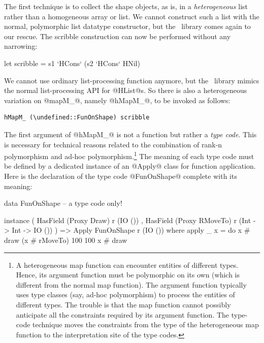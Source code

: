 The first technique is to collect the shape objects, as is, in a
\emph{heterogeneous} list rather than a homogeneous array or list. We
cannot construct such a list with the normal, polymorphic list datatype
constructor, but the \HList\ library comes again to our rescue. 
The scribble construction can now be performed without any
narrowing:

\begin{code}
       let scribble = s1 `HCons` (s2 `HCons` HNil)
\end{code}

\noindent
We cannot use ordinary list-processing function anymore, but the
\HList\ library mimics the normal list-processing API for @HList@s. So
there is also a heterogeneous variation on @mapM_@, namely @hMapM_@,
to be invoked as follows:

\begin{Verbatim}[fontsize=\small,commandchars=\\\{\}]
       hMapM_ (\undefined::FunOnShape) scribble
\end{Verbatim}

\noindent
The first argument of @hMapM_@ is not a function but rather a
\emph{type code}. This is necessary for technical reasons related to
the combination of rank-n polymorphism and ad-hoc
polymorphism.\footnote{A heterogeneous map function can encounter
entities of different types. Hence, its argument function must be
polymorphic on its own (which is different from the normal map
function). The argument function typically uses type classes (say,
ad-hoc polymorphism) to process the entities of different types. The
trouble is that the map function cannot possibly anticipate all the
constraints required by its argument function.  The type-code
technique moves the constraints from the type of the heterogeneous map
function to the interpretation site of the type codes.} The meaning of
each type code must be defined by a dedicated instance of an @Apply@
class for function application. Here is the declaration of the type
code @FunOnShape@ complete with its meaning:

\begin{code}
 data FunOnShape -- a type code only!
\end{code}

\begin{code}
instance ( HasField (Proxy Draw) r (IO ())
         , HasField (Proxy RMoveTo) r (Int -> Int -> IO ())
         )
      => Apply FunOnShape r (IO ())
  where
    apply _ x = do
                   x # draw
                   (x # rMoveTo) 100 100
                   x # draw
\end{code}

